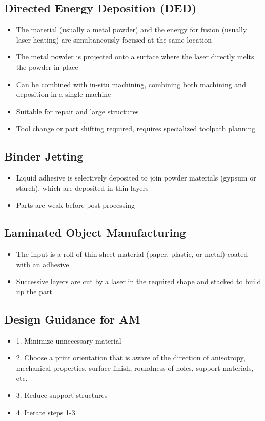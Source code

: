 \documentclass{article}
\begin{document}
\subsection{Directed Energy Deposition (DED)}

\begin{itemize}
    \item The material (usually a metal powder) and the energy for fusion (usually laser heating) are simultaneously focused at the same location
    \item The metal powder is projected onto a surface where the laser directly melts the powder in place
    \item Can be combined with in-situ machining, combining both machining and deposition in a single machine
    \item Suitable for repair and large structures
    \item Tool change or part shifting required, requires specialized toolpath planning
\end{itemize}

\subsection{Binder Jetting}

\begin{itemize}
    \item Liquid adhesive is selectively deposited to join powder materials (gypsum or starch), which are deposited in thin layers
    \item Parts are weak before post-processing
\end{itemize}

\subsection{Laminated Object Manufacturing}

\begin{itemize}
    \item The input is a roll of thin sheet material (paper, plastic, or metal) coated with an adhesive
    \item Successive layers are cut by a laser in the required shape and stacked to build up the part
\end{itemize}

\subsection{Design Guidance for AM}

\begin{itemize}
    \item 1. Minimize unnecessary material
    \item 2. Choose a print orientation that is aware of the direction of anisotropy, mechanical properties, surface finish, roundness of holes, support materials, etc.
    \item 3. Reduce support structures
    \item 4. Iterate steps 1-3
\end{itemize}
\end{document}
